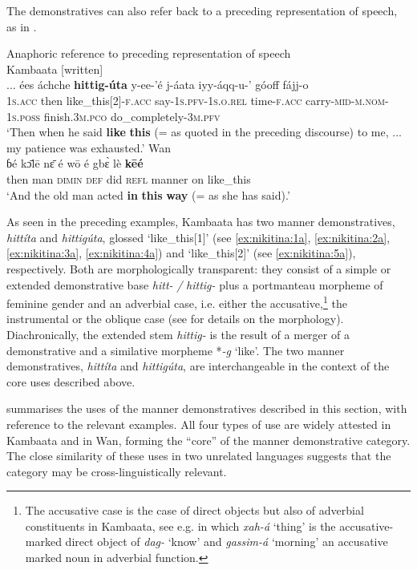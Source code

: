 \documentclass[output=paper,colorlinks,citecolor=brown]{langscibook}
\begin{document}
The demonstratives can also refer back to a preceding representation of speech, as in .

\ea\label{ex:nikitina:5}
  {Anaphoric reference to preceding representation of speech}\\
\ea\label{ex:nikitina:5a} {Kambaata [written]}\\
\gll ... ées áchche \textbf{hittig-úta} y-ee-’é j-áata iyy-áqq-u-’ góoff fájj-o\\
     {} \textsc{1s.acc} then like\_this[2]\textsc{{}-f.acc} say-\textsc{1s.pfv}{}-\textsc{1s.o.rel} time-\textsc{f.acc} carry-\textsc{mid}{}-\textsc{m.nom}{}-1\textsc{s.poss} finish.\textsc{3m.pco} do\_completely-\textsc{3m.pfv}\\
\glt ‘Then when he said \textbf{like} \textbf{this} (= as quoted in the preceding discourse) to me, ... my patience was exhausted.’ 
\ex\label{ex:nikitina:5b} {Wan}\\
\gll ɓé k\={ɔ}lē n\={ɛ} é wō é gb\`{ɛ} lè \textbf{kēé}\\
     then man \textsc{dimin} \textsc{def} did \textsc{refl} manner on like\_this\\
\glt ‘And the old man acted \textbf{in} \textbf{this} \textbf{way} (= as she has said).’
\z
\z

As seen in the preceding examples, Kambaata has two manner demonstratives, \textit{hittíta} and \textit{hittigúta}, glossed ‘like\_this[1]’ (see \ref{ex:nikitina:1a}, \ref{ex:nikitina:2a}, \ref{ex:nikitina:3a}, \ref{ex:nikitina:4a}) and ‘like\_this[2]’ (see \ref{ex:nikitina:5a}), respectively. Both are morphologically transparent: they consist of a simple or extended demonstrative base \textit{hitt-} \textit{/} \textit{hittig-} plus a portmanteau morpheme of feminine gender and an adverbial case, i.e. either the accusative,\footnote{The accusative case is the case of direct objects but also of adverbial constituents in Kambaata, see e.g.  in which \textit{xah-á} ‘thing’ is the accusative-marked direct object of \textit{dag-} ‘know’ and \textit{gassim-á} ‘morning’ an accusative marked noun in adverbial function.} the instrumental or the oblique case (see \citet{Treis2019} for details on the morphology). Diachronically, the extended stem \textit{hittig-} is the result of a merger of a demonstrative and a similative morpheme *\textit{\nobreakdash-g} ‘like’. The two manner demonstratives, \textit{hittíta} and \textit{hittigúta}, are interchangeable in the context of the core uses described above.

 summarises the uses of the manner demonstratives described in this section, with reference to the relevant examples. All four types of use are widely attested in Kambaata and in Wan, forming the “core” of the manner demonstrative category. The close similarity of these uses in two unrelated languages suggests that the category may be cross-linguistically relevant.
\end{document}
